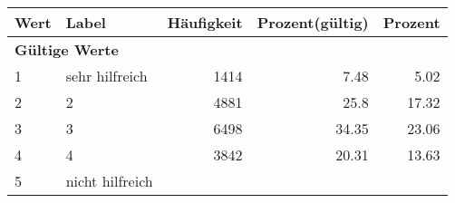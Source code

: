      \begin{longtable}{lXrrr}
     \toprule
     \textbf{Wert} & \textbf{Label} & \textbf{Häufigkeit} & \textbf{Prozent(gültig)} & \textbf{Prozent} \\
     \endhead
     \midrule
     \multicolumn{5}{l}{\textbf{Gültige Werte}}\\

     1 &
     \multicolumn{1}{X}{ sehr hilfreich   } &


       \num{1414} &
       \num[round-mode=places,round-precision=2]{7.48} &
         \num[round-mode=places,round-precision=2]{5.02} \\

     2 &
     \multicolumn{1}{X}{ 2   } &


       \num{4881} &
       \num[round-mode=places,round-precision=2]{25.8} &
         \num[round-mode=places,round-precision=2]{17.32} \\

     3 &
     \multicolumn{1}{X}{ 3   } &


       \num{6498} &
       \num[round-mode=places,round-precision=2]{34.35} &
         \num[round-mode=places,round-precision=2]{23.06} \\

     4 &
     \multicolumn{1}{X}{ 4   } &


       \num{3842} &
       \num[round-mode=places,round-precision=2]{20.31} &
         \num[round-mode=places,round-precision=2]{13.63} \\

     5 &
     \multicolumn{1}{X}{ nicht hilfreich   } &



\end{longtable}
